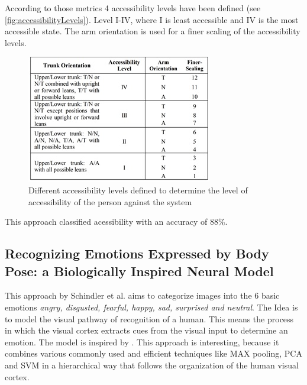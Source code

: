 \documentclass[conference]{IEEEtran}
\begin{document}
According to those metrics 4 accessibility levels\cite{mccoll2012affect} have been defined (see \autoref{fig:accessibilityLevels}). Level I-IV, where I is least accessible and IV is the most accessible state. The arm orientation is used for a finer scaling of the accessibility levels.

\begin{figure}[H]
\centering
\includegraphics[width=\linewidth]{accessibilityLevels.jpg}
\caption{Different accessibility levels defined to determine the level of accessibility of the person against the system\cite{mccoll2012affect}}
\label{fig:accessibilityLevels}
\end{figure}


This approach classified acessibility with an accuracy of 88\%\cite{mccoll2012affect}.


\subsection{Recognizing Emotions Expressed by Body Pose: a Biologically Inspired Neural Model}
This approach by Schindler et al.\cite{schindler2008recognizing} aims to categorize images into the 6 basic emotions\cite{eckman2003emotions} \emph{angry, disgusted, fearful, happy, sad, surprised and neutral}. The Idea is to model the visual pathway of recognition of a human. This means the process in which the visual cortex extracts cues from the visual input to determine an emotion\cite{schindler2008recognizing}. The model is inspired by \cite{riesenhuber1999hierarchical,serre2007robust}. This approach is interesting, because it combines various commonly used and efficient techniques like MAX pooling, PCA and SVM in a hierarchical way that follows the organization of the human visual cortex.
\end{document}
